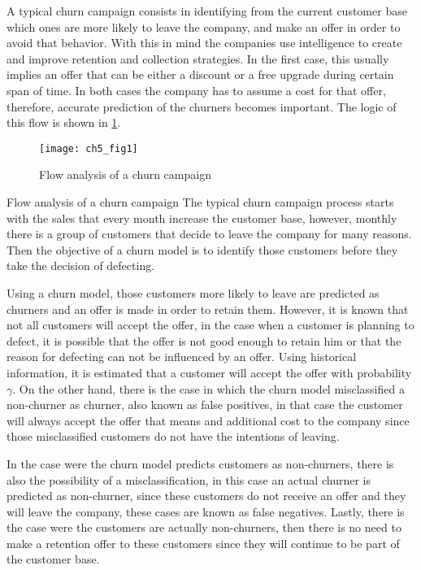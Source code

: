 A typical churn campaign consists in identifying from the current customer base which ones are 
more likely to leave the company, and make an offer in order to avoid that behavior.
With this in mind the companies use intelligence to create and improve retention and collection
strategies. In the first case, this usually implies an offer that can be either a discount or a 
free upgrade during certain span of time. In both cases the company has to 	assume a cost for that 
offer, therefore, accurate prediction of the churners becomes important. The logic of this flow is 
shown in \figurename{ \ref{fig:ch5:1}}.

	\begin{figure}[htbp]
	  \centering
    \texttt{[image: ch5\_fig1]}   %
	  \caption{Flow analysis of a churn campaign \citep{Verbraken2012}}
	  \label{fig:ch5:1}
	\end{figure}

\begin{remark}{Flow analysis of a churn campaign}
The typical churn campaign process starts with the sales that every month increase the customer 
base, however, monthly there is a group of customers that decide to leave the company for many 
reasons. Then the objective of a churn model is to identify those customers before they take the 
decision of defecting.

Using a churn model, those customers more likely to leave are predicted as churners and 
an offer is made in order to retain them. However, it is known that not all customers will accept 
the offer, in the case when a customer is planning to defect, it is possible that the offer is not 
good enough to retain him or that the reason for defecting can not be influenced by an offer.
Using historical information, it is estimated that a customer will accept the offer with 
probability $\gamma$.
On the other hand, there is the case in which the churn model misclassified a non-churner as 
churner, also known as false positives, in that case the customer will always accept the offer that 
means and additional cost to the company since those misclassified customers do not have the 
intentions of leaving.

In the case were the churn model predicts customers as non-churners, there is also the possibility 
of a misclassification, in this case an actual churner is predicted as non-churner, since 
these customers do not receive an offer and they will leave the company, these cases are known as 
false negatives. Lastly, there is the case were the customers are actually non-churners, then 
there is no need to make a retention offer to these customers since they will continue to be part 
of the customer base.
\end{remark}


